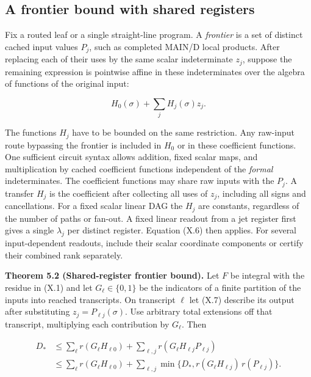 \documentclass[
  11pt,
]{article}
\begin{document}
\subsection{A frontier bound with shared
registers}\label{a-frontier-bound-with-shared-registers}

Fix a routed leaf or a single straight-line program. A \emph{frontier}
is a set of distinct cached input values \(P_j\), such as completed
MAIN/D local products. After replacing each of their uses by the same
scalar indeterminate \(z_j\), suppose the remaining expression is
pointwise affine in these indeterminates over the algebra of functions
of the original input:

\[
       H_0(\sigma)+\sum_{j}H_j(\sigma)z_j .                  \tag{X.7}
\]

The functions \(H_j\) have to be bounded on the same restriction. Any
raw-input route bypassing the frontier is included in \(H_0\) or in
these coefficient functions. One sufficient circuit syntax allows
addition, fixed scalar maps, and multiplication by cached coefficient
functions independent of the \emph{formal} indeterminates. The
coefficient functions may share raw inputs with the \(P_j\). A transfer
\(H_j\) is the coefficient after collecting all uses of \(z_j\),
including all signs and cancellations. For a fixed scalar linear DAG the
\(H_j\) are constants, regardless of the number of paths or fan-out. A
fixed linear readout from a jet register first gives a single
\(\lambda_j\) per distinct register. Equation (X.6) then applies. For
several input-dependent readouts, include their scalar coordinate
components or certify their combined rank separately.

\textbf{Theorem 5.2 (Shared-register frontier bound).} Let \(F\) be integral with the residue in (X.1) and
let \(G_\ell\in\{0,1\}\) be the indicators of a finite partition of the
inputs into reached transcripts. On transcript \(\ell\) let (X.7)
describe its output after substituting \(z_j=P_{\ell j}(\sigma)\). Use
arbitrary total extensions off that transcript, multiplying each
contribution by \(G_\ell\). Then

\[
\begin{split}
 D_*&\le\sum_\ell r(G_\ell H_{\ell0})
       +\sum_{\ell,j} r(G_\ell H_{\ell j} P_{\ell j})\\
 &\le\sum_\ell r(G_\ell H_{\ell0})
       +\sum_{\ell,j}\min\{D_*,
                   r(G_\ell H_{\ell j})\,r(P_{\ell j})\}.
\end{split}
\tag{X.8}
\]
\end{document}

